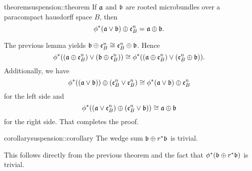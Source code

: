 \begin{mystatement}{theorem}{suspension::theorem}
    If $\mathfrak{a}$ and $\bb$ are rooted microbundles
    over a paracompact hausdorff space $B$, then
    \[ \whitney{\ind{\phi}(\ba \vee \bb)}{\be{B}} = \whitney{\ba}{\bb}. \]
\end{mystatement}

\begin{myproof}
    The previous lemma yields $\whitney{\bb}{\be{B}} \cong \whitney{\be{B}}{\bb}$.
    Hence
    \[
        \ind{\phi}((\whitney{\ba}{\be{B}}) \vee (\whitney{\bb}{\be{B}}))
        \cong \ind{\phi}((\whitney{\ba}{\be{B}}) \vee (\whitney{\be{B}}{\bb})).
    \]
    Additionally, we have
    \[
        \whitney{\ind{\phi}((\ba \vee \bb))}{(\be{B} \vee \be{B})}
        \cong \whitney{\ind{\phi}(\ba \vee \bb)}{\be{B}}
    \]
    for the left side and
    \[
        \ind{\phi}(\whitney{(\ba \vee \be{B})}{(\be{B} \vee \bb)})
        \cong \whitney{\ba}{\bb}
    \]
    for the right side. That completes the proof.
\end{myproof}

\begin{mystatement}{corollary}{suspension::corollary}
    The wedge sum $\whitney{\bb}{\ind{r}\bb}$ is trivial.
\end{mystatement}

\begin{myproof}
    This follows directly from the previous theorem and
    the fact that $\ind{\phi}(\whitney{\bb}{\ind{r}\bb})$ is trivial.
\end{myproof}